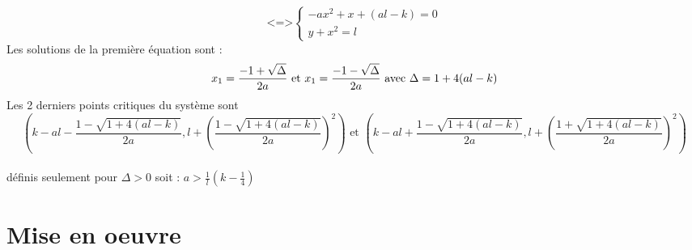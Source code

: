 \documentclass{article}
\begin{document}
$$
 \text{<=>}
\left\{
\begin{array}{ll}
-ax^{2}  +x + (al -k) =0\\
y + x^{2} = l
\end{array}
\right.
$$
Les solutions de la première équation sont :  
$$
x_{1} = \frac{-1 + \sqrt{\Delta}}{2a}  \text{ et } x_{1} = \frac{-1 - \sqrt{\Delta}}{2a}
\text{  avec  }  \Delta = 1 + 4(al -k)\\
$$
Les 2 derniers points critiques du système sont
$$
(k-al -  \frac{1 - \sqrt{ 1 + 4(al -k)}}{2a},l +  (\frac{1 - \sqrt{ 1 + 4(al -k)}}{2a})^{2}) \text{ et } (k-al +  \frac{1 - \sqrt{ 1 + 4(al -k)}}{2a},l +  (\frac{1 + \sqrt{ 1 + 4(al -k)}}{2a})^{2})
$$ 
\\définis seulement pour $\Delta > 0$ soit : $a > \frac{1}{l}(k - \frac{1}{4})$
\section{Mise en oeuvre}
\end{document}
